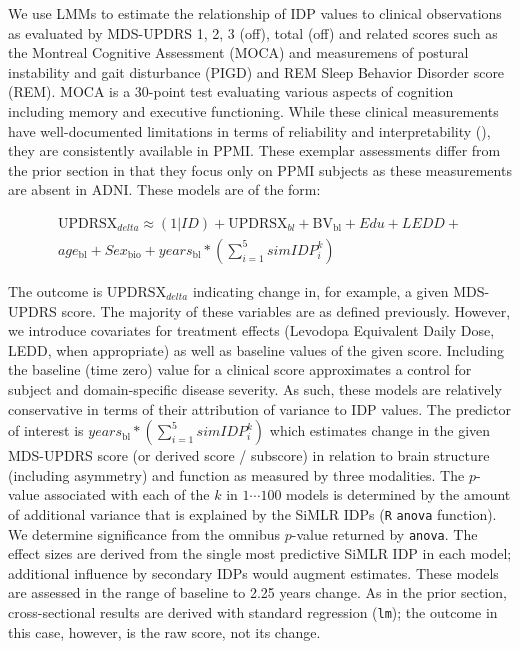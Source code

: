 \documentclass[
  table]{article}
\begin{document}
We use LMMs to estimate the relationship of IDP values to clinical
observations as evaluated by MDS-UPDRS 1, 2, 3 (off), total (off) and
related scores such as the Montreal Cognitive Assessment (MOCA) and
measuremens of postural instability and gait disturbance (PIGD) and REM
Sleep Behavior Disorder score (REM). MOCA is a 30-point test evaluating
various aspects of cognition including memory and executive functioning.
While these clinical measurements have well-documented limitations in
terms of reliability and interpretability
(),
they are consistently available in PPMI. These exemplar assessments
differ from the prior section in that they focus only on PPMI subjects
as these measurements are absent in ADNI. These models are of the form:

\[
\begin{split}
\text{UPDRSX}_{delta} \approx (1|ID) + \text{UPDRSX}_{bl} + \text{BV}_\text{bl} + Edu + LEDD  + \\ 
  age_\text{bl} + Sex_\text{bio} + years_\text{bl}  *  ( \sum_{i=1}^5 simIDP_i^k )
\end{split}
\]

The outcome is \(\text{UPDRSX}_{delta}\) indicating change in, for
example, a given MDS-UPDRS score. The majority of these variables are as
defined previously. However, we introduce covariates for treatment
effects (Levodopa Equivalent Daily Dose, LEDD, when appropriate) as well
as baseline values of the given score. Including the baseline (time
zero) value for a clinical score approximates a control for subject and
domain-specific disease severity. As such, these models are relatively
conservative in terms of their attribution of variance to IDP values.
The predictor of interest is
\(years_\text{bl}  *  ( \sum_{i=1}^5 simIDP_i^k )\) which estimates
change in the given MDS-UPDRS score (or derived score / subscore) in
relation to brain structure (including asymmetry) and function as
measured by three modalities. The \(p\)-value associated with each of
the \(k\) in \(1 \cdots 100\) models is determined by the amount of
additional variance that is explained by the SiMLR IDPs (\texttt{R}
\texttt{anova} function). We determine significance from the omnibus
\(p\)-value returned by \texttt{anova}. The effect sizes are derived
from the single most predictive SiMLR IDP in each model; additional
influence by secondary IDPs would augment estimates. These models are
assessed in the range of baseline to 2.25 years change. As in the prior
section, cross-sectional results are derived with standard regression
(\texttt{lm}); the outcome in this case, however, is the raw score, not
its change.
\end{document}
